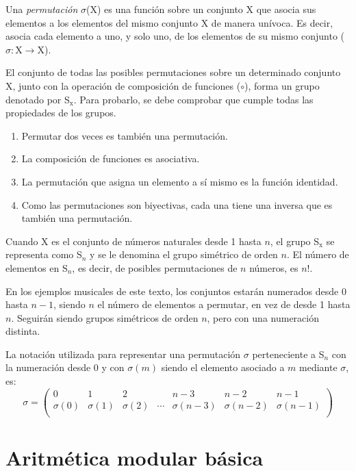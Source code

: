 		Una \emph{permutación} $\sigma$(X) es una función sobre un conjunto X que asocia sus elementos a los elementos del mismo conjunto X de manera unívoca. Es decir, asocia cada elemento a uno, y solo uno, de los elementos de su mismo conjunto ($\sigma:\text{X}\to \text{X}$).

		El conjunto de todas las posibles permutaciones sobre un determinado conjunto X, junto con la operación de composición de funciones ($\circ$), forma un grupo denotado por S$_\text{x}$. Para probarlo, se debe comprobar que cumple todas las propiedades de los grupos.

		\begin{enumerate}
			\item{Permutar dos veces es también una permutación.}
			\item{La composición de funciones es asociativa.}
			\item{La permutación que asigna un elemento a sí mismo es la función identidad.}
			\item{Como las permutaciones son biyectivas, cada una tiene una inversa que es también una permutación.}		
		\end{enumerate}

		Cuando X es el conjunto de números naturales desde 1 hasta $n$, el grupo S$_\text{x}$ se representa como S$_n$ y se le denomina el grupo simétrico de orden $n$. El número de elementos en S$_n$, es decir, de posibles permutaciones de $n$ números, es $n!$. 
		
		En los ejemplos musicales de este texto, los conjuntos estarán numerados desde 0 hasta $n-1$, siendo $n$ el número de elementos a permutar, en vez de desde 1 hasta $n$. Seguirán siendo grupos simétricos de orden $n$, pero con una numeración distinta.
		
		La notación utilizada para representar una permutación $\sigma$ perteneciente a S$_n$ con la numeración desde 0 y con $\sigma(m)$ siendo el elemento asociado a $m$ mediante $\sigma$, es:
		\[\sigma=\left(\begin{matrix}0&1&2&&n-3&n-2&n-1\\\sigma\left(0\right)&\sigma\left(1\right)&\sigma\left(2\right)&\cdots&\sigma\left(n-3\right)&\sigma\left(n-2\right)&\sigma\left(n-1\right)\\\end{matrix}\right)\]
		
	\section{Aritmética modular básica}
